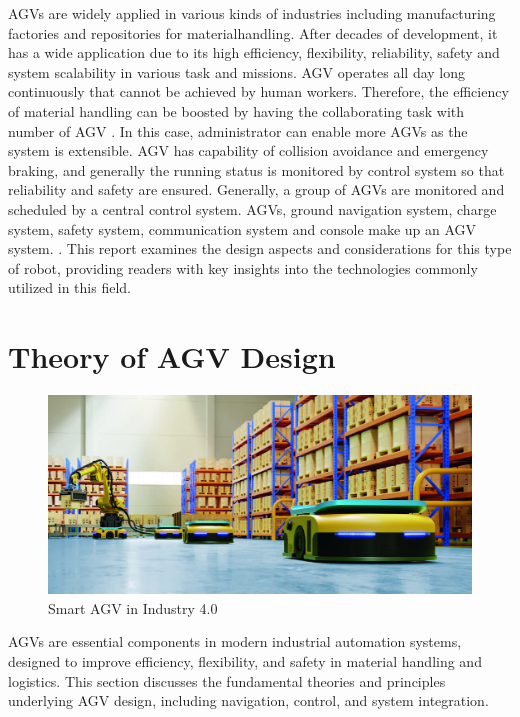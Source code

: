 \documentclass[main]{subfiles}
\begin{document}
AGVs are widely applied in various kinds
of industries including manufacturing
factories and repositories for materialhandling.
After decades of development, it
has a wide application due to its high
efficiency, flexibility, reliability, safety and
system scalability in various task and
missions.
AGV operates all day long continuously
that cannot be achieved by human workers.
Therefore, the efficiency of material
handling can be boosted by having the
collaborating task with number of AGV
. In this case, administrator can enable
more AGVs as the system is extensible.
AGV has capability of collision avoidance
and emergency braking, and generally the
running status is monitored by control
system so that reliability and safety are
ensured. Generally, a group of AGVs are
monitored and scheduled by a central
control system. AGVs, ground navigation
system, charge system, safety system,
communication system and console make
up an AGV system. \cite{shengfang2006research}. This report examines the design aspects and considerations for this type of robot, providing readers with key insights into the technologies commonly utilized in this field. 


\newpage
\chapter{Theory of AGV Design}
\begin{figure}[h]
    \centering
\includegraphics[width=\textwidth]{doc/smart_agv.jpg}
\caption{Smart AGV in Industry 4.0}
\end{figure}
AGVs are essential components in modern industrial automation systems, designed to improve efficiency, flexibility, and safety in material handling and logistics. This section discusses the fundamental theories and principles underlying AGV design, including navigation, control, and system integration.
\end{document}
